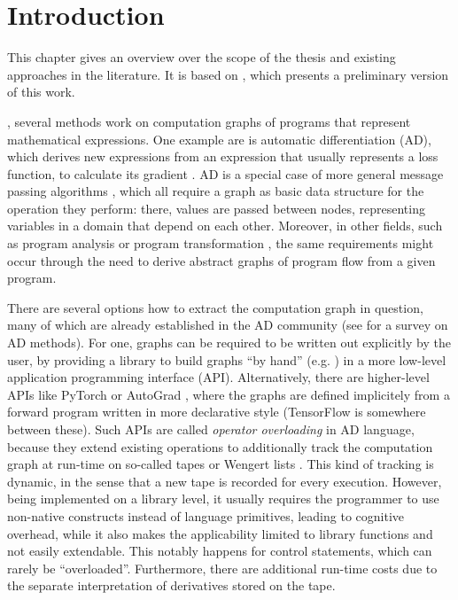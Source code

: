\chapter{Introduction}
\label{cha:introduction}

This chapter gives an overview over the scope of the thesis and existing approaches in the
literature.  It is based on \textcite{gabler2019graph}, which presents a preliminary version of this
work.

, several methods work on computation graphs of programs that
represent mathematical expressions.  One example are is automatic differentiation (AD), which
derives new expressions from an expression that usually represents a loss function, to calculate its
gradient \parencite{griewank2008evaluating, gebremedhin2020introduction}.  AD is a special case of
more general message passing algorithms
\parencite{minka2005divergence,ruozzi2011message,minka2019automatic}, which all require a graph as
basic data structure for the operation they perform: there, values are passed between nodes,
representing variables in a domain that depend on each other.  Moreover, in other fields, such as
program analysis or program transformation
\parencite[cf.][]{muchnick1997advanced,singer2018static,aho1986compilers}, the same requirements
might occur through the need to derive abstract graphs of program flow from a given program.

There are several options how to extract the computation graph in question, many of which are
already established in the AD community (see \textcite{baydin2018automatic} for a survey on AD
methods).  For one, graphs can be required to be written out explicitly by the user, by providing a
library to build graphs \enquote{by hand} (e.g. \textcite{chewxy2020gorgonia,jia2014caffe}) in a
more low-level application programming interface (API).  Alternatively, there are higher-level APIs
like PyTorch \parencite{paszke2017automatic} or AutoGrad \parencite{maclaurin2015autograd}, where
the graphs are defined implicitely from a forward program written in more declarative style
(TensorFlow \parencite{abadi2015tensorflow} is somewhere between these).  Such APIs are called
\emph{operator overloading} in AD language, because they extend existing operations to additionally
track the computation graph at run-time on so-called tapes or Wengert lists
\parencite{bartholomew-biggs2000automatic}.  This kind of tracking is dynamic, in the sense that a
new tape is recorded for every execution.  However, being implemented on a library level, it usually
requires the programmer to use non-native constructs instead of language primitives, leading to
cognitive overhead, while it also makes the applicability limited to library functions and not
easily extendable.  This notably happens for control statements, which can rarely be
\enquote{overloaded}.  Furthermore, there are additional run-time costs due to the separate
interpretation of derivatives stored on the tape.

